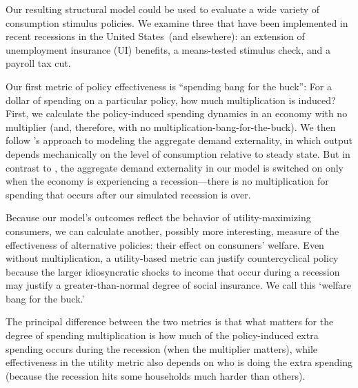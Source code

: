 \documentclass[\econtexRoot/HAFiscal]{subfiles}
\begin{document}
Our resulting structural model could be used to evaluate a wide variety of consumption stimulus policies.  We examine three that have been implemented in recent recessions in the United States\ (and elsewhere): an extension of unemployment insurance (UI) benefits, a means-tested stimulus check, and a payroll tax cut.    

Our first metric of policy effectiveness is ``spending bang for the buck'': For a dollar of spending on a particular policy, how much multiplication is induced?  %
First, we calculate the policy-induced spending dynamics in an economy with no multiplier (and, therefore, with no multiplication-bang-for-the-buck).  We then follow \cite{kmpHandbook2016}'s approach to modeling the aggregate demand externality, in which output depends mechanically on the level of consumption relative to steady state. But in contrast to \cite{kmpHandbook2016}, the aggregate demand externality in our model is switched on only when the economy is experiencing a recession---there is no multiplication for spending that occurs after our simulated recession is over.  %

Because our model's outcomes reflect the behavior of utility-maximizing consumers, we can calculate another, possibly more interesting, measure of the effectiveness of alternative policies:  their effect on consumers' welfare.  Even without multiplication, a utility-based metric can justify countercyclical policy because the larger idiosyncratic shocks to income that occur during a recession may justify a greater-than-normal degree of social insurance.  We call this `welfare bang for the buck.'

The principal difference between the two metrics is that what matters for the degree of spending multiplication is how much of the policy-induced extra spending occurs during the recession (when the multiplier matters), while effectiveness in the utility metric also depends on who is doing the extra spending (because the recession hits some households much harder than others).
\end{document}
